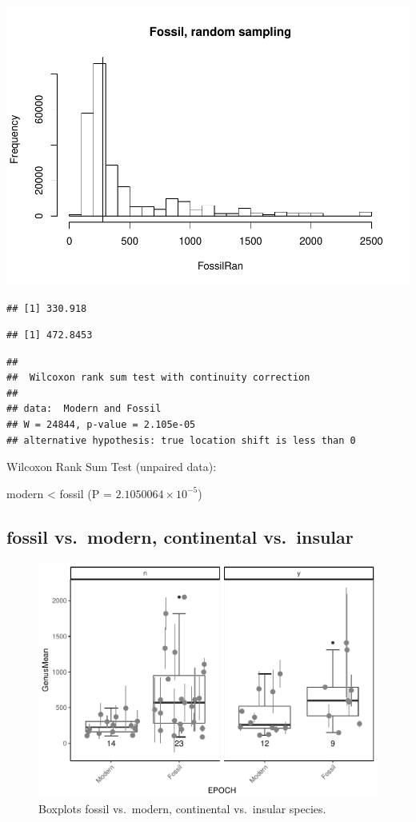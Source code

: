 \documentclass[]{article}
\begin{document}
\includegraphics{MA_JJ_files/figure-latex/randon sampling modern fossil-1.pdf}

\begin{verbatim}
## [1] 330.918
\end{verbatim}

\begin{verbatim}
## [1] 472.8453
\end{verbatim}

\begin{verbatim}
## 
##  Wilcoxon rank sum test with continuity correction
## 
## data:  Modern and Fossil
## W = 24844, p-value = 2.105e-05
## alternative hypothesis: true location shift is less than 0
\end{verbatim}

Wilcoxon Rank Sum Test (unpaired data):

modern \textless{} fossil (P = \(2.1050064\times 10^{-5}\))

\newpage

\subsection{fossil vs.~modern, continental
vs.~insular}\label{fossil-vs.modern-continental-vs.insular}

\begin{figure}[htbp]
\centering
\includegraphics{MA_JJ_files/figure-latex/Boxplots fossil vs. modern, continental vs. insular-1.pdf}
\caption{Boxplots fossil vs.~modern, continental vs.~insular species.}
\end{figure}
\end{document}
